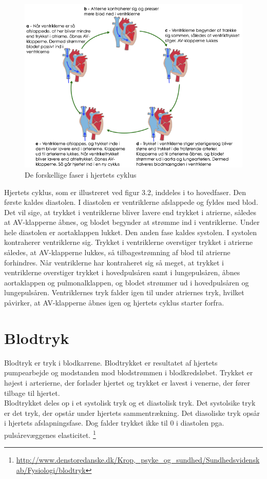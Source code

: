 \begin{figure}[htb]
	\centering
	\includegraphics[width=1\textwidth]{Figurer/Fysio/Cyklus}
	\caption{De forskellige faser i hjertets cyklus \protect\footnotemark}
\end{figure}

Hjertets cyklus, som er illustreret ved figur 3.2, inddeles i to hovedfaser. Den første kaldes diastolen. I diastolen er ventriklerne afslappede og fyldes med blod. Det vil sige, at trykket i ventriklerne bliver lavere end trykket i atrierne, således at AV-klapperne åbnes, og blodet begynder at strømme ind i ventriklerne. Under hele diastolen er aortaklappen lukket. Den anden fase kaldes systolen. I systolen kontraherer ventriklerne sig. Trykket i ventriklerne overstiger trykket i atrierne således, at AV-klapperne lukkes, så tilbagestrømning af blod til atrierne forhindres. Når ventriklerne har kontraheret sig så meget, at trykket i ventriklerne overstiger trykket i hovedpulsåren samt i lungepulsåren, åbnes aortaklappen og pulmonalklappen, og blodet strømmer ud i hovedpulsåren og lungepulsåren. Ventriklernes tryk falder igen til under atriernes tryk, hvilket påvirker, at AV-klapperne åbnes igen og hjertets cyklus starter forfra.\\

\section{Blodtryk}
Blodtryk er tryk i blodkarrene. Blodtrykket er resultatet af hjertets pumpearbejde og modstanden mod blodstrømmen i blodkredsløbet. Trykket er højest i arterierne, der forlader hjertet og trykket er lavest i venerne, der fører tilbage til hjertet.\\
Blodtrykket deles op i et systolisk tryk og et diastolisk tryk. Det systolsike tryk er det tryk, der opstår under hjertets sammentrækning. Det diasoliske tryk opsår i hjertets afslapningsfase. Dog falder trykket ikke til 0 i diastolen pga. pulsårevæggenes elasticitet. 
\footnote{\url{http://www.denstoredanske.dk/Krop,_psyke_og_sundhed/Sundhedsvidenskab/Fysiologi/blodtryk}}


